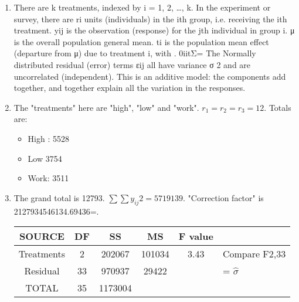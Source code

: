 \documentclass[a4paper,12pt]{article}
\begin{document}
\begin{enumerate}
\item %
There are k treatments, indexed by i = 1, 2, …, k. In the experiment or survey, there are ri units (individuals) in the ith group, i.e. receiving the ith treatment. yij is the observation (response) for the jth individual in group i.
μ is the overall population general mean. ti is the population mean effect (departure from μ) due to treatment i, with . 0iitΣ=
The Normally distributed residual (error) terms εij all have variance σ 2 and are uncorrelated (independent).
This is an additive model: the components add together, and together explain all the variation in the responses.
\item The "treatments" here are "high", "low" and "work". $r_1 = r_2 = r_3 = 12$.
Totals are:
\begin{itemize}
\item High : 5528
\item  Low 3754
\item Work: 3511
\end{itemize}




\item The grand total is 12793. $\sum \sum y_{ij}2 = 5719139$.
"Correction factor" is 2127934546134.69436=.


\begin{center}
\begin{tabular}{|c|c|c|c|c|l|} \hline 
SOURCE & DF & SS & MS & F value &  \\ \hline \hline
Treatments & 2 & 202067& 101034& 3.43 & Compare F2,33\\ \hline 
Residual & 33& 970937& 29422 &  & = $\hat{\sigma}$ \\ \hline 
TOTAL & 35& 1173004&&&\\ \hline 
\end{tabular}
\end{center}


\end{enumerate}
\end{document}
